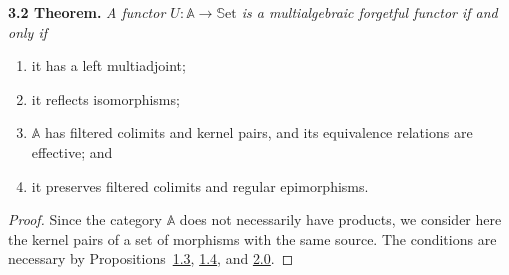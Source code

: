 \documentclass{article}
\newenvironment{itenv}[1]
  {\phantomsection\par\medskip\noindent\textbf{#1.}\itshape}
  {\medskip}
\newcommand{\bb}[1]{{\mathbb{#1}}}
\newcommand{\Set}{\mathbb{S}\mathrm{et}}
\begin{document}
\begin{itenv}{3.2 Theorem}
\label{3.2}
  A functor $U\colon\bb{A}\to\Set$ is a multialgebraic forgetful functor if and only if
  \begin{enumerate}[1)]
    \item it has a left multiadjoint;
    \item it reflects isomorphisms;
    \item $\bb{A}$ has filtered colimits and kernel pairs, and its equivalence relations are effective; and
    \item it preserves filtered colimits and regular epimorphisms.
  \end{enumerate}
\end{itenv}

\begin{proof}
  Since the category $\bb{A}$ does not necessarily have products, we consider here the kernel pairs of a set of morphisms with the same source.
  The conditions are necessary by Propositions~\hyperref[1.3]{1.3}, \hyperref[1.4]{1.4}, and \hyperref[2.0]{2.0}.


\end{proof}
\end{document}
